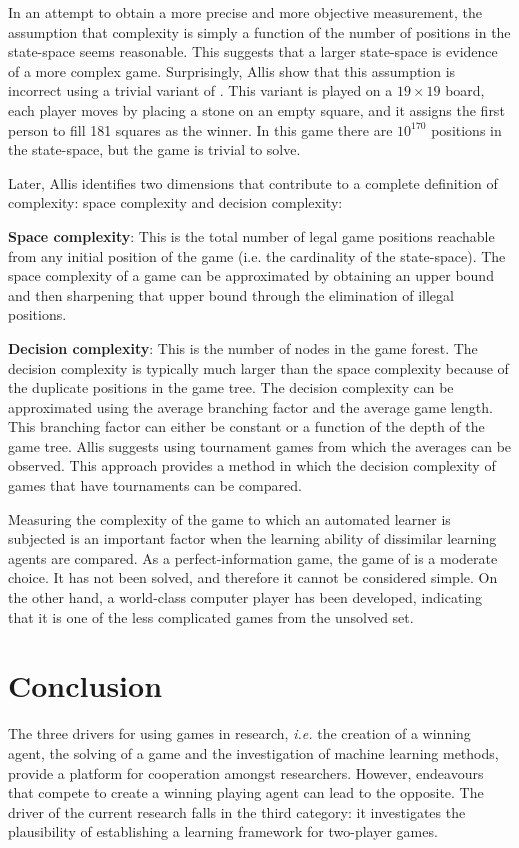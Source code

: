 In an attempt to obtain a more precise and more objective measurement, the assumption that complexity is simply a function of the number of positions in the state-space seems reasonable. This suggests that a larger state-space is evidence of a more complex game.  Surprisingly, Allis \etal \cite{allis:survive} show that this assumption is incorrect using a trivial variant of . This variant is played on a $19 \times 19$ board, each player moves by placing a stone on an empty square, and it assigns the first person to fill 181 squares as the winner.  In this game there are $10^{170}$ positions in the state-space, but the game is trivial to solve. 

Later, Allis \cite{allis:which} identifies two dimensions that contribute to a complete definition of complexity: space complexity and decision complexity: 
\begin{mydesclist}
\item {\bf Space complexity}: This is the total number of legal game positions reachable from any initial position of the game (i.e. the cardinality of the state-space). The space complexity of a game can be approximated by obtaining an upper bound and then sharpening that upper bound through the elimination of illegal positions.
\item {\bf Decision complexity}: This is the number of nodes in the game forest.   The decision complexity is typically much larger than the space complexity because of the duplicate positions in the game tree.   The decision complexity can be approximated using the average branching factor and the average game length.  This branching factor can either be constant or a function of the depth of the game tree.  Allis suggests using tournament games from which the averages can be observed.   This approach provides a method in which the decision complexity of games that have tournaments can be compared.
\end{mydesclist}

Measuring the complexity of the game to which an automated learner is subjected is an important factor when the learning ability of dissimilar learning agents are compared. As a perfect-information game, the game of  is a moderate choice.  It has not been solved, and therefore it cannot be considered simple. On the other hand, a world-class computer player has been developed, indicating that it is one of the less complicated games from the unsolved set. 

\section{Conclusion}
\label{sec:two-player-conclusion}
The three drivers for using games in research, {\it i.e.} the creation of a winning agent, the solving of a game and the investigation of machine learning methods, provide a platform for cooperation amongst researchers.  However, endeavours that compete to create a winning playing agent can lead to the opposite.  The driver of the current research falls in the third category: it investigates the plausibility of establishing a learning framework for two-player games.

